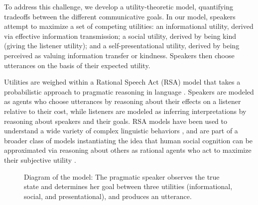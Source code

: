 \documentclass[12pt]{article}
\begin{document}

To address this challenge, we develop a utility-theoretic model, quantifying tradeoffs between the different communicative goals. In our model, speakers attempt to maximize a set of competing
utilities: an informational utility, derived via effective
information transmission; a social utility, derived by being kind (giving the listener utility); and a self-presentational utility, derived
by being perceived as valuing information transfer or kindness.
Speakers then choose utterances on the basis of their
expected utility.

Utilities are weighed within a Rational Speech Act (RSA) model that
takes a probabilistic approach to pragmatic reasoning in language \cite{frank2012, goodman2016}. Speakers are modeled as agents
who choose utterances by reasoning about their effects on a listener
relative to their cost, while listeners are modeled as inferring
interpretations by reasoning about speakers and their goals.  RSA models have been used to understand a wide variety of complex
linguistic behaviors \cite{lassiter2017adjectival, kao2014, kao2015}, and are part of a broader class of models instantiating the idea that human social cognition can be approximated via reasoning about others as rational agents who act to maximize their subjective utility \cite{baker2009action,jara2016naive, liu2017ten}.

\begin{figure}
\centering
\caption{\label{fig:model}Diagram of the model: The pragmatic speaker observes the true state and determines her goal between three utilities (informational, social, and presentational), and produces an utterance.
}
\end{figure}
\end{document}
